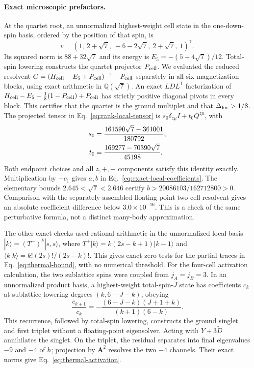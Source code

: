 \paragraph*{Exact microscopic prefactors.}
At the quartet root, an unnormalized highest-weight cell state in the
one-down-spin basis, ordered by the position of that spin, is
\begin{equation}
 v=(1,\ 2+\sqrt7,\ -6-2\sqrt7,\ 2+\sqrt7,\ 1)^{\mathsf T}.
\end{equation}
Its squared norm is $88+32\sqrt7$ and its energy is
$E_5=-(5+4\sqrt7)/12$. Total-spin lowering constructs the quartet
projector $P_{\rm cell}$. We evaluated the reduced resolvent
$G=(H_{\rm cell}-E_5+P_{\rm cell})^{-1}-P_{\rm cell}$ separately in all
six magnetization blocks, using exact arithmetic in $\mathbb Q(\sqrt7)$.
An exact $LDL^{\mathsf T}$ factorization of
$H_{\rm cell}-E_5-\tfrac18(1-P_{\rm cell})+P_{\rm cell}$
has strictly positive diagonal pivots in every block. This certifies
that the quartet is the ground multiplet and that $\Delta_{\mathrm{loc}}>1/8$.
The projected tensor in Eq.~\eqref{eq:rank-local-tensor} is
$s_0\delta_{z\mu}I+t_0Q^{z\mu}$, with
\begin{align}
 s_0&=\frac{161590\sqrt7-361001}{180792},\notag\\
 t_0&=\frac{169277-70390\sqrt7}{45198}.
\end{align}
Both endpoint choices and all $z,+,-$ components satisfy this identity
exactly. Multiplication by $-c_1$ gives $a,b$ in
Eq.~\eqref{eq:exact-local-coefficients}. The elementary bounds
$2.645<\sqrt7<2.646$ certify $b>20086103/162712800>0$.
Comparison with the separately assembled floating-point two-cell
resolvent gives an absolute coefficient difference below
$3.0\times10^{-16}$. This is a check of the same perturbative formula,
not a distinct many-body approximation.

The other exact checks used rational arithmetic in the unnormalized local basis
$|k\rangle=(T^-)^k|s,s\rangle$, where
$T^+|k\rangle=k(2s-k+1)|k-1\rangle$ and
$\langle k|k\rangle=k!(2s)!/(2s-k)!$.
This gives exact zero tests for the partial traces in
Eq.~\eqref{eq:thermal-bound}, with no numerical threshold.
For the four-cell activation calculation, the two sublattice spins were
coupled from $j_A=j_B=3$. In an unnormalized product basis, a highest-weight
total-spin-$J$ state has coefficients $c_k$ at sublattice lowering degrees
$(k,6-J-k)$, obeying
\begin{equation}
 \frac{c_{k+1}}{c_k}
 =-\frac{(6-J-k)(J+1+k)}{(k+1)(6-k)}.
\end{equation}
This recurrence, followed by total-spin lowering, constructs the ground
singlet and first triplet without a floating-point eigensolver.
Acting with $Y+3\widetilde D$ annihilates the singlet. On the triplet,
the residual separates into final eigenvalues $-9$ and $-4$ of $h$;
projection by $\bm A^2$ resolves the two $-4$ channels. Their exact norms
give Eq.~\eqref{eq:thermal-activation}.

